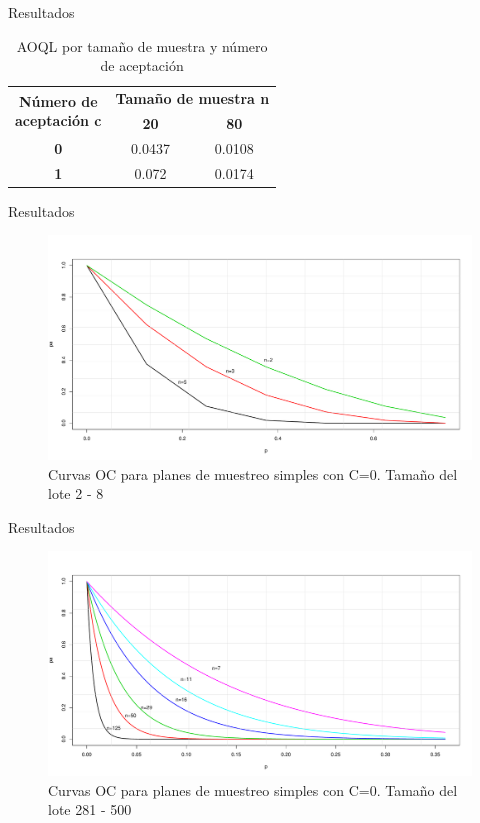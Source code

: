 \documentclass[10pt]{beamer}
\begin{document}
\begin{frame}{Resultados}
\begin{table}[htbp]
  \centering
    \begin{tabular}{|c|c|c|}
    \hline
    \multicolumn{1}{|c|}{\multirow{2}[4]{*}{\textbf{Número de\newline{} aceptación c}}} & \multicolumn{2}{c|}{\textbf{Tamaño de muestra n}} \\
\cline{2-3}          & \textbf{20} & \textbf{80} \\
    \hline
    \textbf{0} & 0.0437 & 0.0108 \\
    \hline
    \textbf{1} & 0.072 & 0.0174 \\
    \hline
    \end{tabular}%
    \caption{AOQL por tamaño de muestra y número de aceptación}
  \label{tab:addlabel}%
\end{table}%
\end{frame}

\begin{frame}{Resultados}
\begin{figure}[h!]
  \centering
  \includegraphics[scale=0.33]{FigurasUV/CO1.pdf}
  \caption{Curvas OC para planes de muestreo simples con C=0. Tamaño del lote 2 - 8}
\end{figure}
\end{frame}

\begin{frame}{Resultados}
\begin{figure}[h!]
  \centering
  \includegraphics[scale=0.33]{FigurasUV/CO8.pdf}
  \caption{Curvas OC para planes de muestreo simples con C=0. Tamaño del lote 281 - 500}
\end{figure}
\end{frame}
\end{document}
